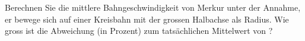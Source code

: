 Berechnen Sie die mittlere Bahngeschwindigkeit von Merkur unter der Annahme, er bewege sich auf einer Kreisbahn mit der grossen Halbachse als Radius. Wie gross ist die Abweichung (in Prozent) zum tatsächlichen Mittelwert von \vReO?
